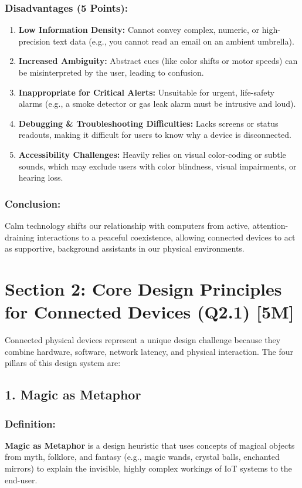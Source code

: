 \subsubsection{Disadvantages (5 Points):}
\begin{enumerate}
  \item \textbf{Low Information Density:} Cannot convey complex, numeric, or high-precision text data (e.g., you cannot read an email on an ambient umbrella).
  \item \textbf{Increased Ambiguity:} Abstract cues (like color shifts or motor speeds) can be misinterpreted by the user, leading to confusion.
  \item \textbf{Inappropriate for Critical Alerts:} Unsuitable for urgent, life-safety alarms (e.g., a smoke detector or gas leak alarm must be intrusive and loud).
  \item \textbf{Debugging \& Troubleshooting Difficulties:} Lacks screens or status readouts, making it difficult for users to know why a device is disconnected.
  \item \textbf{Accessibility Challenges:} Heavily relies on visual color-coding or subtle sounds, which may exclude users with color blindness, visual impairments, or hearing loss.
\end{enumerate}

\subsubsection{Conclusion:}
Calm technology shifts our relationship with computers from active, attention-draining interactions to a peaceful coexistence, allowing connected devices to act as supportive, background assistants in our physical environments.


\section{Section 2: Core Design Principles for Connected Devices (Q2.1) [5M]}

Connected physical devices represent a unique design challenge because they combine hardware, software, network latency, and physical interaction. The four pillars of this design system are:


\subsection{1. Magic as Metaphor}

\subsubsection{Definition:}
\textbf{Magic as Metaphor} is a design heuristic that uses concepts of magical objects from myth, folklore, and fantasy (e.g., magic wands, crystal balls, enchanted mirrors) to explain the invisible, highly complex workings of IoT systems to the end-user.

